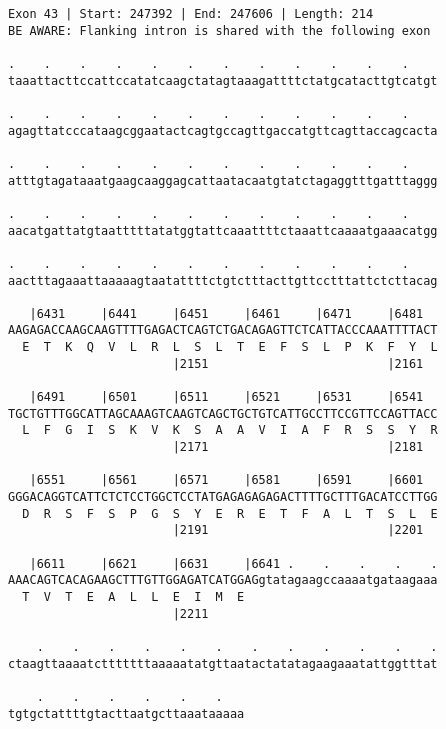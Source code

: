 \documentclass{article}
\begin{document}
\newpage
\begin{Verbatim}[fontfamily=courier]
Exon 43 | Start: 247392 | End: 247606 | Length: 214
BE AWARE: Flanking intron is shared with the following exon

.    .    .    .    .    .    .    .    .    .    .    .    
taaattacttccattccatatcaagctatagtaaagattttctatgcatacttgtcatgt

.    .    .    .    .    .    .    .    .    .    .    .    
agagttatcccataagcggaatactcagtgccagttgaccatgttcagttaccagcacta

.    .    .    .    .    .    .    .    .    .    .    .    
atttgtagataaatgaagcaaggagcattaatacaatgtatctagaggtttgatttaggg

.    .    .    .    .    .    .    .    .    .    .    .    
aacatgattatgtaatttttatatggtattcaaattttctaaattcaaaatgaaacatgg

.    .    .    .    .    .    .    .    .    .    .    .    
aactttagaaattaaaaagtaatattttctgtctttacttgttcctttattctcttacag

   |6431     |6441     |6451     |6461     |6471     |6481  
AAGAGACCAAGCAAGTTTTGAGACTCAGTCTGACAGAGTTCTCATTACCCAAATTTTACT
  E  T  K  Q  V  L  R  L  S  L  T  E  F  S  L  P  K  F  Y  L
                       |2151                         |2161  

   |6491     |6501     |6511     |6521     |6531     |6541  
TGCTGTTTGGCATTAGCAAAGTCAAGTCAGCTGCTGTCATTGCCTTCCGTTCCAGTTACC
  L  F  G  I  S  K  V  K  S  A  A  V  I  A  F  R  S  S  Y  R
                       |2171                         |2181  

   |6551     |6561     |6571     |6581     |6591     |6601  
GGGACAGGTCATTCTCTCCTGGCTCCTATGAGAGAGAGACTTTTGCTTTGACATCCTTGG
  D  R  S  F  S  P  G  S  Y  E  R  E  T  F  A  L  T  S  L  E
                       |2191                         |2201  

   |6611     |6621     |6631     |6641 .    .    .    .    .
AAACAGTCACAGAAGCTTTGTTGGAGATCATGGAGgtatagaagccaaaatgataagaaa
  T  V  T  E  A  L  L  E  I  M  E                           
                       |2211                                

    .    .    .    .    .    .    .    .    .    .    .    .
ctaagttaaaatctttttttaaaaatatgttaatactatatagaagaaatattggtttat

    .    .    .    .    .    .   
tgtgctattttgtacttaatgcttaaataaaaa
\end{Verbatim}
\newpage
\end{document}
